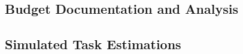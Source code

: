 \newpage
\begin{appendices}
\section{Budget Documentation and Analysis}
\label{appendix:budget}

\subsection{Simulated Task Estimations}


\end{appendices}
